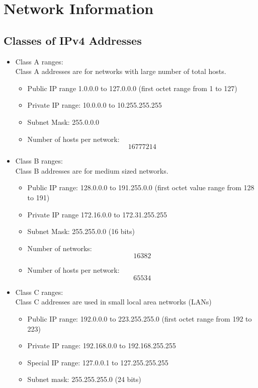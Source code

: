 \section{Network Information}

\subsection{Classes of IPv4 Addresses}
\begin{itemize}
    \item Class A ranges:\\
    Class A addresses are for networks with large number of total hosts.
    \begin{itemize}
        \item Public IP range 1.0.0.0 to 127.0.0.0 (first octet range from 1 to 127)
        \item Private IP range: 10.0.0.0 to 10.255.255.255
        \item Subnet Mask: 255.0.0.0
        \item Number of hosts per network: \[16777214\]
    \end{itemize}
    \item Class B ranges:\\
    Class B addresses are for medium sized networks.
    \begin{itemize}
        \item Public IP range: 128.0.0.0 to 191.255.0.0 (first octet value range from 128 to 191)
        \item Private IP range 172.16.0.0 to 172.31.255.255
        \item Subnet Mask: 255.255.0.0 (16 bits)
        \item Number of networks: \[16382\]
        \item Number of hosts per network: \[65534\]
    \end{itemize}
    \item Class C ranges:\\
    Class C addresses are used in small local area networks (LANs)
    \begin{itemize}
        \item Public IP range: 192.0.0.0 to 223.255.255.0 (first octet range from 192 to 223)
        \item Private IP range: 192.168.0.0 to 192.168.255.255
        \item Special IP range: 127.0.0.1 to 127.255.255.255
        \item Subnet mask: 255.255.255.0 (24 bits)

\end{itemize}
\end{itemize}
